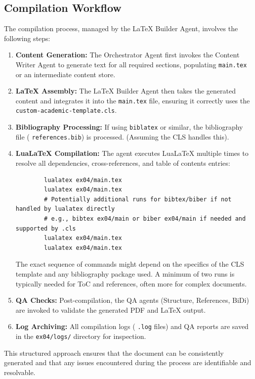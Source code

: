 \documentclass{custom-academic-template}
\begin{document}
\subsection{Compilation Workflow}
The compilation process, managed by the LaTeX Builder Agent, involves the following steps:
\begin{enumerate}
    \item 	\textbf{Content Generation:} The Orchestrator Agent first invokes the Content Writer Agent to generate text for all required sections, populating 	\texttt{main.tex} or an intermediate content store.
    \item 	\textbf{LaTeX Assembly:} The LaTeX Builder Agent then takes the generated content and integrates it into the 	\texttt{main.tex} file, ensuring it correctly uses the 	\texttt{custom-academic-template.cls}.
    \item 	\textbf{Bibliography Processing:} If using 	\texttt{biblatex} or similar, the bibliography file (	\texttt{references.bib}) is processed. (Assuming the CLS handles this).
    \item 	\textbf{LuaLaTeX Compilation:} The agent executes LuaLaTeX multiple times to resolve all dependencies, cross-references, and table of contents entries:
        \begin{verbatim}
        lualatex ex04/main.tex
        lualatex ex04/main.tex
        # Potentially additional runs for bibtex/biber if not handled by lualatex directly
        # e.g., bibtex ex04/main or biber ex04/main if needed and supported by .cls
        lualatex ex04/main.tex
        lualatex ex04/main.tex
        \end{verbatim}
        The exact sequence of commands might depend on the specifics of the CLS template and any bibliography package used. A minimum of two runs is typically needed for ToC and references, often more for complex documents.
    \item 	\textbf{QA Checks:} Post-compilation, the QA agents (Structure, References, BiDi) are invoked to validate the generated PDF and LaTeX output.
    \item 	\textbf{Log Archiving:} All compilation logs (	\texttt{.log} files) and QA reports are saved in the 	\texttt{ex04/logs/} directory for inspection.
\end{enumerate}
This structured approach ensures that the document can be consistently generated and that any issues encountered during the process are identifiable and resolvable.

\end{document}
